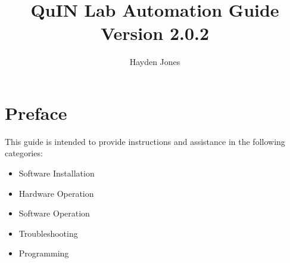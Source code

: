\documentclass[11pt, letterpaper, titlepage]{article}
\begin{document}
\author{Hayden Jones}
\title{QuIN Lab Automation Guide \\ {\normalsize Version 2.0.2}}
\maketitle
\section*{Preface} \label{preface}
This guide is intended to provide instructions and assistance in the following categories:
\begin{itemize}
    \item Software Installation
    \item Hardware Operation
    \item Software Operation
    \item Troubleshooting
    \item Programming
\end{itemize}
\newpage
\end{document}
